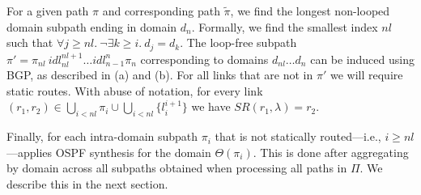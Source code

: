 For a given path $\pi$ and corresponding path $\tilde{\pi}$,
we find the longest non-looped domain subpath ending in domain
$d_n$. Formally, we find the smallest index $nl$ such that
$\forall j \geq nl. ~\neg\exists k \geq i.~d_j = d_k$. 
The loop-free subpath $\pi'=\pi_{nl} ~idl_{nl}^{nl+1}\ldots idl_{n-1}^n \pi_n$ corresponding to
domains $d_{nl} \ldots d_n$
can be induced using BGP, as described in (a)
and (b).
For all links that are not in $\pi'$
we will require static routes.
With abuse of notation, for every link $(r_1,r_2)\in\bigcup_{i< nl} \pi_i\cup \bigcup_{i< nl}\{l_i^{i+1}\}$ 
we have
$SR(r_1, \lambda) = r_2$.

Finally, for each intra-domain subpath $\pi_i$ that is not statically routed---i.e., $i\geq nl$---\name applies
OSPF synthesis for the domain $\Theta(\pi_i)$. 
This is done after aggregating by domain across all subpaths obtained when processing all paths in $\Pi$.
We describe this in the next section.



